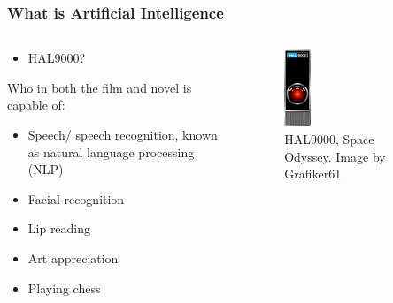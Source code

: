 \documentclass[aspectratio=169]{beamer}
\begin{document}
  \begin{frame}
    \frametitle{What is Artificial Intelligence}
    \begin{columns}
      \begin{column}{0.5\textwidth}
        \begin{itemize}
          \item HAL9000?
        \end{itemize}
        Who in both the film and novel is capable of:
        \begin{itemize}
          \item Speech/ speech recognition, known as natural language processing (NLP)
          \item Facial recognition
          \item Lip reading
          \item Art appreciation
          \item Playing chess
        \end{itemize}
      \end{column}
      \begin{column}{0.5\textwidth}
        \begin{figure}[th!]
          \centering
          \includegraphics[width=0.2\textwidth]{hal9000.pdf}
          \caption{HAL9000, Space Odyssey. Image by Grafiker61 \autocite{cc}}
          \label{fig:jim_carrey}
        \end{figure}
      \end{column}
    \end{columns}
  \end{frame}
\end{document}
